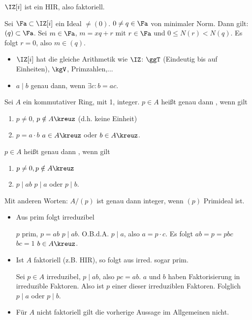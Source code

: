 
\renewcommand{\lecdate}{22.10.14}

\begin{Folgerung}
 $\IZ[i]$ ist ein HIR, also faktoriell.
\end{Folgerung}

\begin{Beweis}
 Sei $\Fa\subset \IZ[i]$ ein Ideal $\neq(0)$. $0\neq q\in \Fa$ von minimaler Norm. Dann gilt: $(q)\subset\Fa$. Sei $m\in \Fa$, $m=xq+r$ mit $r\in\Fa$ und $0\leq N(r)<N(q)$. 
 Es folgt $r=0$, also $m\in(q)$.
\end{Beweis}

\begin{Bemerkung}
 \begin{itemize}
  \item $\IZ[i]$ hat die gleiche Arithmetik wie $\IZ$: $\ggT$ (Eindeutig bis auf Einheiten), $\kgV$, Primzahlen,...
  \item $a\mid b$ genau dann, wenn $\exists c: b=ac$.
 \end{itemize}
\end{Bemerkung}

\begin{Definition}
 Sei $A$ ein kommutativer Ring, mit 1, integer. $p\in A$ heißt genau dann , wenn gilt
 \begin{enumerate}
  \item $p\neq 0$, $p\notin A\kreuz$ (d.h. keine Einheit)
  \item $p=a\cdot b$ \folge $a\in A\kreuz$ oder $b\in A\kreuz$.
 \end{enumerate}

 $p\in A$ heißt genau dann , wenn gilt
 \begin{enumerate}
  \item $p\neq 0, p\notin A\kreuz$
  \item $p\mid ab$ \folge $p\mid a$ oder $p\mid b$.
 \end{enumerate}
 Mit anderen Worten: $A/(p)$ ist genau dann integer, wenn $(p)$ Primideal ist.
\end{Definition}

\begin{Bemerkung}
 \begin{itemize}
  \item Aus prim folgt irreduzibel
  
  $p$ prim, $p=ab$ \folge $p\mid ab$. O.B.d.A. $p\mid a$, also $a=p\cdot c$. Es folgt $ab=p=pbc$ \folge $bc=1$ \folge $b\in A\kreuz$.
  \item Ist $A$ faktoriell (z.B. HIR), so folgt aus irred. sogar prim.
  
  Sei $p\in A$ irreduzibel, $p\mid ab$, also $pc=ab$. $a$ und $b$ haben Faktorisierung in irreduzible Faktoren. Also ist $p$ einer dieser irreduziblen Faktoren. Folglich $p\mid a$ oder $p\mid b$.
  \item Für $A$ nicht faktoriell gilt die vorherige Aussage im Allgemeinen nicht.
 \end{itemize}

\end{Bemerkung}

